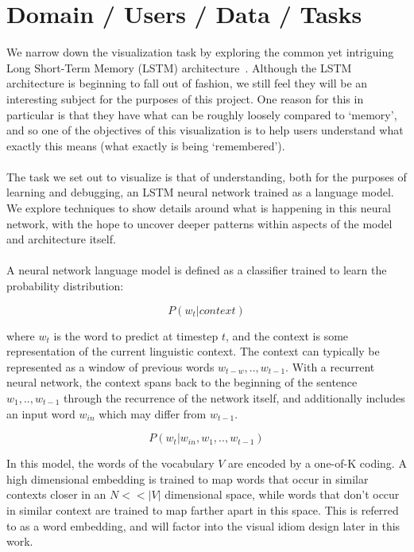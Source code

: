 \documentclass[journal]{vgtc}                %
\begin{document}
\section{Domain / Users / Data / Tasks}
We narrow down the visualization task by exploring the common yet intriguing Long Short-Term Memory (LSTM) architecture~\cite{lstm}.
Although the LSTM architecture is beginning to fall out of fashion, we still feel they will be an interesting subject for the purposes of this project.
One reason for this in particular is that they have what can be roughly loosely compared to `memory', and so one of the objectives of this visualization is to help users understand what exactly this means (what exactly is being `remembered').
\\
\\
The task we set out to visualize is that of understanding, both for the purposes of learning and debugging, an LSTM neural network trained as a language model.
We explore techniques to show details around what is happening in this neural network, with the hope to uncover deeper patterns within aspects of the model and architecture itself.
\\
\\
A neural network language model is defined as a classifier trained to learn the probability distribution:

\begin{equation}
    P(w_t|context)
\end{equation}

where $w_t$ is the word to predict at timestep $t$, and the context is some representation of the current linguistic context.
The context can typically be represented as a window of previous words $w_{t-w},..,w_{t-1}$.
With a recurrent neural network, the context spans back to the beginning of the sentence $w_1,..,w_{t-1}$ through the recurrence of the network itself, and additionally includes an input word $w_{in}$ which may differ from $w_{t-1}$.

\begin{equation}
    P(w_t|w_{in},w_1,..,w_{t-1})
\end{equation}

In this model, the words of the vocabulary $V$ are encoded by a one-of-K coding.
A high dimensional embedding is trained to map words that occur in similar contexts closer in an $N << |V|$ dimensional space, while words that don't occur in similar context are trained to map farther apart in this space.
This is referred to as a word embedding, and will factor into the visual idiom design later in this work.
\end{document}
